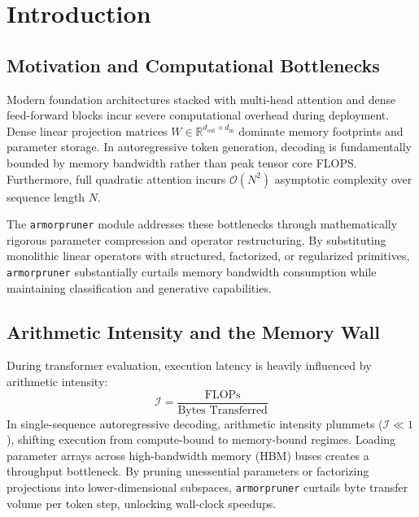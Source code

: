 \section{Introduction}

\subsection{Motivation and Computational Bottlenecks}
Modern foundation architectures stacked with multi-head attention and dense feed-forward blocks incur severe computational overhead during deployment. Dense linear projection matrices $W \in \mathbb{R}^{d_{\text{out}} \times d_{\text{in}}}$ dominate memory footprints and parameter storage. In autoregressive token generation, decoding is fundamentally bounded by memory bandwidth rather than peak tensor core FLOPS. Furthermore, full quadratic attention incurs $\mathcal{O}(N^2)$ asymptotic complexity over sequence length $N$.

The \texttt{armorpruner} module addresses these bottlenecks through mathematically rigorous parameter compression and operator restructuring. By substituting monolithic linear operators with structured, factorized, or regularized primitives, \texttt{armorpruner} substantially curtails memory bandwidth consumption while maintaining classification and generative capabilities.

\subsection{Arithmetic Intensity and the Memory Wall}
During transformer evaluation, execution latency is heavily influenced by arithmetic intensity:
\[
\mathcal{I} = \frac{\text{FLOPs}}{\text{Bytes Transferred}}
\]
In single-sequence autoregressive decoding, arithmetic intensity plummets ($\mathcal{I} \ll 1$), shifting execution from compute-bound to memory-bound regimes. Loading parameter arrays across high-bandwidth memory (HBM) buses creates a throughput bottleneck. By pruning unessential parameters or factorizing projections into lower-dimensional subspaces, \texttt{armorpruner} curtails byte transfer volume per token step, unlocking wall-clock speedups.

